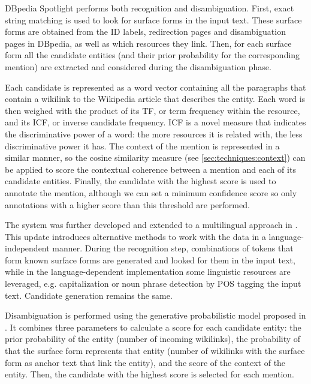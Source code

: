 DBpedia Spotlight performs both recognition and disambiguation. First, exact string matching is used to look for surface forms in the input text. These surface forms are obtained from the ID labels, redirection pages and disambiguation pages in DBpedia, as well as which resources they link. Then, for each surface form all the candidate entities (and their prior probability for the corresponding mention) are extracted and considered during the disambiguation phase.

Each candidate is represented as a word vector containing all the paragraphs that contain a wikilink to the Wikipedia article that describes the entity. Each word is then weighed with the product of its TF, or term frequency within the resource, and its ICF, or inverse candidate frequency. ICF is a novel measure that indicates the discriminative power of a word: the more resources it is related with, the less discriminative power it has. The context of the mention is represented in a similar manner, so the cosine similarity measure (see \autoref{sec:techniques:context}) can be applied to score the contextual coherence between a mention and each of its candidate entities. Finally, the candidate with the highest score is used to annotate the mention, although we can set a minimum confidence score so only annotations with a higher score than this threshold are performed.

The system was further developed and extended to a multilingual approach in \cite{daiber2013}. This update introduces alternative methods to work with the data in a language-independent manner. During the recognition step, combinations of tokens that form known surface forms are generated and looked for them in the input text, while in the language-dependent implementation some linguistic resources are leveraged, e.g. capitalization or noun phrase detection by POS tagging the input text. Candidate generation remains the same.

Disambiguation is performed using the generative probabilistic model proposed in \cite{han2011generative}. It combines three parameters to calculate a score for each candidate entity: the prior probability of the entity (number of incoming wikilinks), the probability of that the surface form represents that entity (number of wikilinks with the surface form as anchor text that link the entity), and the score of the context of the entity. Then, the candidate with the highest score is selected for each mention.

\medskip

